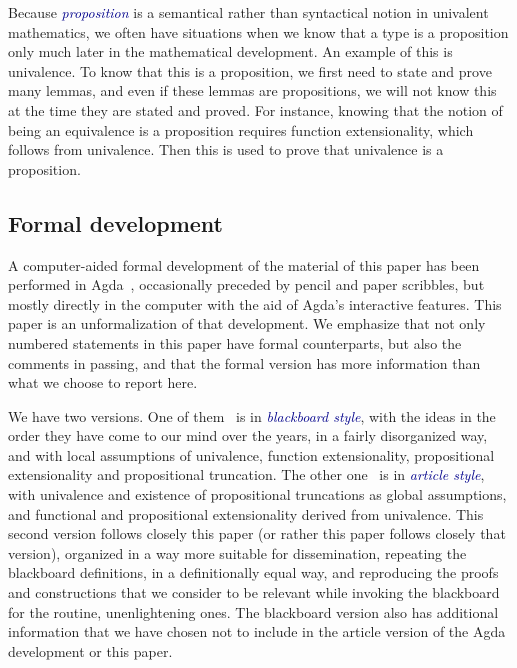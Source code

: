 \documentclass[10pt]{article}
\newcommand{\db}{\textcolor{darkblue}}
\newcommand{\df}[1]{\emph{\db{#1}}}
\theoremstyle{definition}
\begin{document}
\begin{enumerate}
  Because \df{proposition} is a semantical rather than syntactical
  notion in univalent mathematics, we often have situations when we
  know that a type is a proposition only much later in the
  mathematical development. An example of this is univalence. To know
  that this is a proposition, we first need to state and prove many lemmas,
  and even if these lemmas are propositions, we will not know this at
  the time they are stated and proved. For instance, knowing that the
  notion of being an equivalence is a proposition requires function
  extensionality, which follows from univalence. Then this is used to
  prove that univalence is a proposition.

\end{enumerate}

\subsection{Formal development}

A computer-aided formal development of the material of this paper has
been performed in Agda~\cite{agda}, occasionally preceded by pencil
and paper scribbles, but mostly directly in the computer with the aid
of Agda's interactive features. This paper is an unformalization of
that development. We emphasize that not only numbered statements in
this paper have formal counterparts, but also the comments in passing,
and that the formal version has more information than what we
choose to report here.

We have two versions. One of them~\cite{injective:blackboard} is in
\df{blackboard style}, with the ideas in the order they have come to
our mind over the years, in a fairly disorganized way, and with local
assumptions of univalence, function extensionality, propositional
extensionality and propositional truncation. The other
one~\cite{injective:article} is in \df{article style}, with univalence
and existence of propositional truncations as global assumptions, and
functional and propositional extensionality derived from
univalence. This second version follows closely this paper (or rather
this paper follows closely that version), organized in a way more
suitable for dissemination, repeating the blackboard definitions, in a
definitionally equal way, and reproducing the proofs and constructions
that we consider to be relevant while invoking the blackboard for the
routine, unenlightening ones. The blackboard version also has
additional information that we have chosen not to include in the
article version of the Agda development or this paper.
\end{document}
